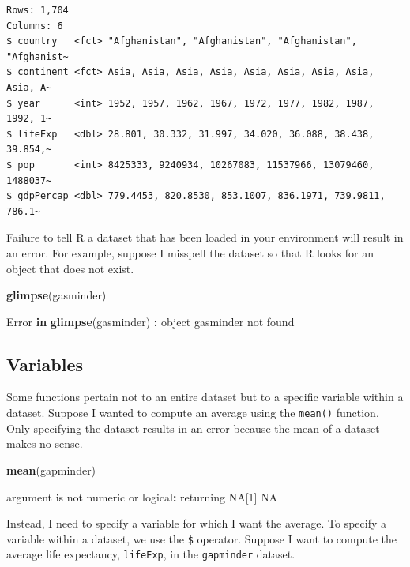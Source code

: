 \documentclass[
]{book}
\makeatletter
\newenvironment{Shaded}{\begin{snugshade}}{\end{snugshade}}
\newcommand{\ConstantTok}[1]{\textcolor[rgb]{0.37,0.37,0.37}{#1}}
\newcommand{\ControlFlowTok}[1]{\textcolor[rgb]{0.27,0.27,0.27}{\textbf{#1}}}
\newcommand{\DecValTok}[1]{\textcolor[rgb]{0.06,0.06,0.06}{#1}}
\newcommand{\FunctionTok}[1]{\textcolor[rgb]{0.27,0.27,0.27}{\textbf{#1}}}
\newcommand{\NormalTok}[1]{#1}
\newcommand{\SpecialCharTok}[1]{\textcolor[rgb]{0.43,0.43,0.43}{\textbf{#1}}}
\newcommand{\StringTok}[1]{\textcolor[rgb]{0.5,0.5,0.5}{#1}}
\newenvironment{kframe}{%
\medskip{}
\setlength{\fboxsep}{.8em}
 \def\at@end@of@kframe{}%
 \ifinner\ifhmode%
  \def\at@end@of@kframe{\end{minipage}}%
  \begin{minipage}{\columnwidth}%
 \fi\fi%
 \def\FrameCommand##1{\hskip\@totalleftmargin \hskip-\fboxsep
 \colorbox{shadecolor}{##1}\hskip-\fboxsep
     \hskip-\linewidth \hskip-\@totalleftmargin \hskip\columnwidth}%
 \MakeFramed {\advance\hsize-\width
   \@totalleftmargin\z@ \linewidth\hsize
   \@setminipage}}%
 {\par\unskip\endMakeFramed%
 \at@end@of@kframe}
\renewenvironment{Shaded}{\begin{kframe}}{\end{kframe}}
\makeatother
\begin{document}
\begin{verbatim}
Rows: 1,704
Columns: 6
$ country   <fct> "Afghanistan", "Afghanistan", "Afghanistan", "Afghanist~
$ continent <fct> Asia, Asia, Asia, Asia, Asia, Asia, Asia, Asia, Asia, A~
$ year      <int> 1952, 1957, 1962, 1967, 1972, 1977, 1982, 1987, 1992, 1~
$ lifeExp   <dbl> 28.801, 30.332, 31.997, 34.020, 36.088, 38.438, 39.854,~
$ pop       <int> 8425333, 9240934, 10267083, 11537966, 13079460, 1488037~
$ gdpPercap <dbl> 779.4453, 820.8530, 853.1007, 836.1971, 739.9811, 786.1~
\end{verbatim}

Failure to tell R a dataset that has been loaded in your environment will result in an error. For example, suppose I misspell the dataset so that R looks for an object that does not exist.

\begin{Shaded}
\begin{Highlighting}[]
\FunctionTok{glimpse}\NormalTok{(gasminder)}

\NormalTok{Error }\ControlFlowTok{in} \FunctionTok{glimpse}\NormalTok{(gasminder) }\SpecialCharTok{:}\NormalTok{ object }\StringTok{\textquotesingle{}gasminder\textquotesingle{}}\NormalTok{ not found}
\end{Highlighting}
\end{Shaded}

\hypertarget{variables}{%
\subsection{Variables}\label{variables}}

Some functions pertain not to an entire dataset but to a specific variable within a dataset. Suppose I wanted to compute an average using the \texttt{mean()} function. Only specifying the dataset results in an error because the mean of a dataset makes no sense.

\begin{Shaded}
\begin{Highlighting}[]
\FunctionTok{mean}\NormalTok{(gapminder)}

\NormalTok{argument is not numeric or logical}\SpecialCharTok{:}\NormalTok{ returning }\ConstantTok{NA}\NormalTok{[}\DecValTok{1}\NormalTok{] }\ConstantTok{NA}
\end{Highlighting}
\end{Shaded}

Instead, I need to specify a variable for which I want the average. To specify a variable within a dataset, we use the \texttt{\$} operator. Suppose I want to compute the average life expectancy, \texttt{lifeExp}, in the \texttt{gapminder} dataset.
\end{document}
